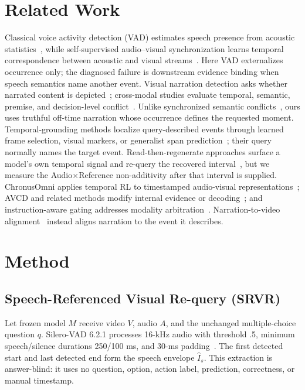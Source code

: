 \section{Related Work}
\label{sec:related-work}

Classical voice activity detection (VAD) estimates speech presence from acoustic statistics~\cite{sohn1999vad}, while self-supervised audio--visual synchronization learns temporal correspondence between acoustic and visual streams~\cite{korbar2018avsync}. Here VAD externalizes occurrence only; the diagnosed failure is downstream evidence binding when speech semantics name another event. Visual narration detection asks whether narrated content is depicted~\cite{ashutosh2023wys2}; cross-modal studies evaluate temporal, semantic, premise, and decision-level conflict~\cite{kim2024avhbench,zhou2026avsyncbench,chen2026avid,nguyenquang2026senseswide}. Unlike synchronized semantic conflicts~\cite{sudheer2026prior}, ours uses truthful off-time narration whose occurrence defines the requested moment. Temporal-grounding methods localize query-described events through learned frame selection, visual markers, or generalist span prediction~\cite{du2026mllmsknowwhen,wang2026videoitg,fang2026markit,zhang2026timelens}; their query normally names the target event. Read-then-regenerate approaches surface a model's own temporal signal and re-query the recovered interval~\cite{du2026mllmsknowwhen}, but we measure the Audio$\times$Reference non-additivity after that interval is supplied. ChronusOmni applies temporal RL to timestamped audio-visual representations~\cite{chen2025chronusomni}; AVCD and related methods modify internal evidence or decoding~\cite{leng2024vcd,jung2025avcd,fan2026stear,wu2026season}; and instruction-aware gating addresses modality arbitration~\cite{ding2026unimvu}. Narration-to-video alignment~\cite{mavroudi2023htstep} instead aligns narration to the event it describes.

\section{Method}
\label{sec:method}

\subsection{Speech-Referenced Visual Re-query (SRVR)}

Let frozen model $M$ receive video $V$, audio $A$, and the unchanged multiple-choice question $q$. Silero-VAD 6.2.1 processes 16-kHz audio with threshold .5, minimum speech/silence durations 250/100 ms, and 30-ms padding~\cite{silero_vad621}. The first detected start and last detected end form the speech envelope $\hat I_s$. This extraction is answer-blind: it uses no question, option, action label, prediction, correctness, or manual timestamp.


